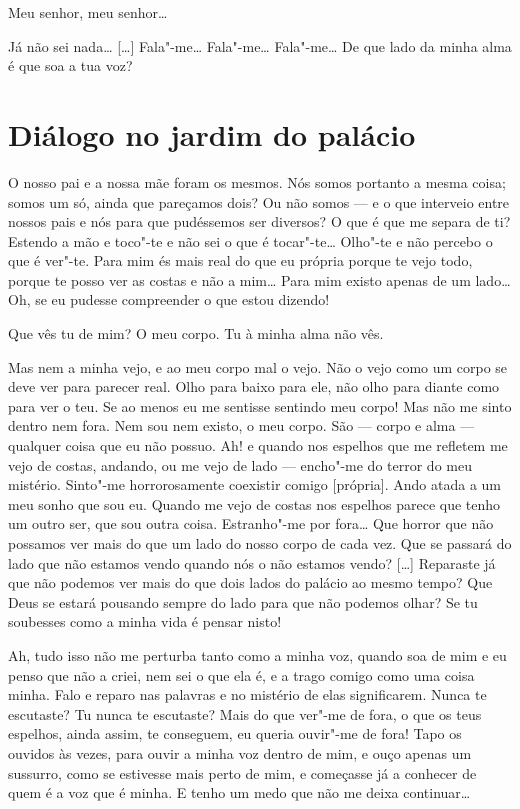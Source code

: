  Meu senhor, meu senhor\ldots{}

 Já não sei nada\ldots{} [\ldots{}] Fala"-me\ldots{} Fala"-me\ldots{} Fala"-me\ldots{}
De que lado da minha alma é que soa a tua voz?


\chapter[Diálogo no jardim do palácio]{Diálogo no jardim do palácio}

 O nosso pai e a nossa mãe foram os mesmos. Nós somos portanto a
mesma coisa; somos um só, ainda que pareçamos dois? Ou não somos --- e
o que interveio entre nossos pais e nós para que pudéssemos ser
diversos? O que é que me separa de ti? Estendo a mão e toco"-te e não
sei o que é tocar"-te\ldots{} Olho"-te e não percebo o que é ver"-te. Para
mim és mais real do que eu própria porque te vejo todo, porque te
posso ver as costas e não a mim\ldots{} Para mim existo apenas de um
lado\ldots{} Oh, se eu pudesse compreender o que estou dizendo!

 Que vês tu de mim? O meu corpo. Tu à minha alma não vês.

 Mas nem a minha vejo, e ao meu corpo mal o vejo. Não o vejo como um
corpo se deve ver para parecer real. Olho para baixo para ele, não
olho para diante como para ver o teu. Se ao menos eu me sentisse
sentindo meu corpo! Mas não me sinto dentro nem fora. Nem sou nem
existo, o meu corpo. São --- corpo e alma --- qualquer coisa que eu não
possuo.  Ah! e quando nos espelhos que me refletem me
vejo de costas, andando, ou me vejo de lado --- encho"-me do terror do
meu mistério. Sinto"-me horrorosamente coexistir comigo [própria].
Ando atada a um meu sonho que sou eu. Quando me vejo de costas nos
espelhos parece que tenho um outro ser, que sou outra coisa.
Estranho"-me por fora\ldots{} Que horror que não possamos ver mais do que
um lado do nosso corpo de cada vez. Que se passará do lado que não
estamos vendo quando nós o não estamos vendo? [\ldots{}] Reparaste já que
não podemos ver mais do que dois lados do palácio ao mesmo tempo? Que
Deus se estará pousando sempre do lado para que não podemos olhar? Se
tu soubesses como a minha vida é pensar nisto! 

 Ah, tudo isso não me perturba tanto como a minha voz, quando soa de
mim e eu penso que não a criei, nem sei o que ela é, e a trago comigo
como uma coisa minha. Falo e reparo nas palavras e no mistério de
elas significarem. Nunca te escutaste? Tu nunca te escutaste? Mais do
que ver"-me de fora, o que os teus espelhos, ainda assim, te
conseguem, eu queria ouvir"-me de fora! Tapo os ouvidos às vezes, para
ouvir a minha voz dentro de mim, e ouço apenas um sussurro, como se
estivesse mais perto de mim, e começasse já a conhecer de quem é a
voz que é minha. E tenho um medo que não me deixa continuar\ldots{}

